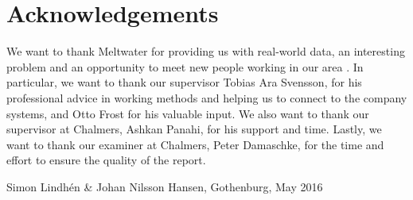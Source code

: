 \thispagestyle{plain}			%
\section*{Acknowledgements}
We want to thank Meltwater for providing us with real-world data, an interesting problem and an opportunity to meet new people working in our area . In particular, we want to thank our supervisor Tobias Ara Svensson, for his professional advice in working methods and helping us to connect to the company systems, and Otto Frost for his valuable input. We also want to thank our supervisor at Chalmers, Ashkan Panahi, for his support and time. Lastly, we want to thank our examiner at Chalmers, Peter Damaschke, for the time and effort to ensure the quality of the report.

\vspace{1.5cm}
\hfill
Simon Lindhén \& Johan Nilsson Hansen, Gothenburg, May 2016

\newpage				%
\thispagestyle{empty}
\mbox{}
